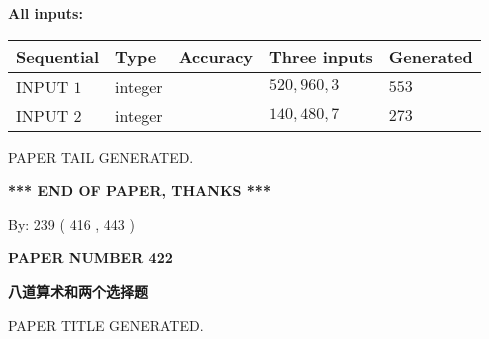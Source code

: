 \documentclass{ctexart}
\begin{document}
   
   
   
\noindent\vspace{0.1in}\hspace{-0.08in} {\textbf{\Large{All inputs: }}}
   
   
  
  
\noindent\begin{tabular}{|l|l|l|l|l|}
\hline
 Sequential & Type & Accuracy & Three inputs & Generated \\ 
\hline
 
 
  INPUT $  1 $ & integer &  & $
 520
 , 
 960
 , 
 3
 $ & $ 553 $ 
 \\  \hline  
 
 
  INPUT $  2 $ & integer &  & $
 140
 , 
 480
 , 
 7
 $ & $ 273 $ 
 \\  \hline  
 \end{tabular}
   
   
   
   
   
   
 \vspace{0.2in}
 
   
   
\vspace{2.0in} PAPER TAIL GENERATED.
   
   
   
   
\vspace{1.0in} 
{\textbf{\large{ *** END OF PAPER, THANKS *** }}} 
   
   
\hspace{1.0in} By: 
 239 ( 416 ,  443 )
   
   
   
   
\newpage 
\setcounter{page}{ 
   422001 } 
   
   
   
   
 {\textbf{ \Large{ PAPER NUMBER  422  }}}
   
   
\vspace{0.2in}
   
   
   
   
   
   
   
   
 \vspace{0.2in}
{\LARGE {\textbf{ 八道算术和两个选择题}}}
   
   
 PAPER TITLE GENERATED.
   
   
   
\vspace{0.2in}
   
\end{document}
